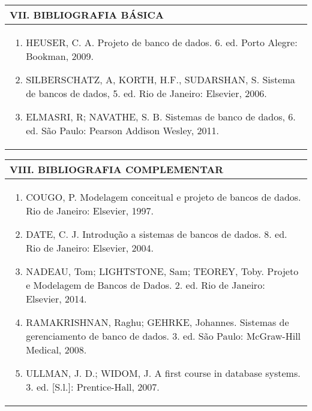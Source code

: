 \documentclass[12pt]{article}
\begin{document}

\begin{longtable}{|L{1.025\textwidth}|} \hline
%
{\bf VII. BIBLIOGRAFIA BÁSICA} \\ \hline
\begin{enumerate}
%
\item HEUSER, C. A. Projeto de banco de dados. 6. ed. Porto Alegre: Bookman, 2009.
\item SILBERSCHATZ, A, KORTH, H.F., SUDARSHAN, S. Sistema de bancos de dados, 5. ed. Rio de Janeiro: Elsevier, 2006.
\item ELMASRI, R; NAVATHE, S. B. Sistemas de banco de dados, 6. ed. São Paulo: Pearson Addison Wesley, 2011.
\end{enumerate}
 \\ \hline
\end{longtable}



\begin{longtable}{|L{1.025\textwidth}|} \hline
%
{\bf VIII. BIBLIOGRAFIA COMPLEMENTAR} \\ \hline
\begin{enumerate}
\item COUGO, P. Modelagem conceitual e projeto de bancos de dados. Rio de Janeiro: Elsevier, 1997.
\item DATE, C. J. Introdução a sistemas de bancos de dados. 8. ed. Rio de Janeiro: Elsevier, 2004.
\item NADEAU, Tom; LIGHTSTONE, Sam; TEOREY, Toby. Projeto e Modelagem de Bancos de Dados. 2. ed. Rio de Janeiro: Elsevier, 2014.
\item RAMAKRISHNAN, Raghu; GEHRKE, Johannes. Sistemas de gerenciamento de banco de dados. 3. ed. São Paulo: McGraw-Hill Medical, 2008.
\item ULLMAN, J. D.; WIDOM, J. A first course in database systems. 3. ed. [S.l.]: Prentice-Hall, 2007.

%
\end{enumerate}
 \\ \hline
\end{longtable}



\end{document}
